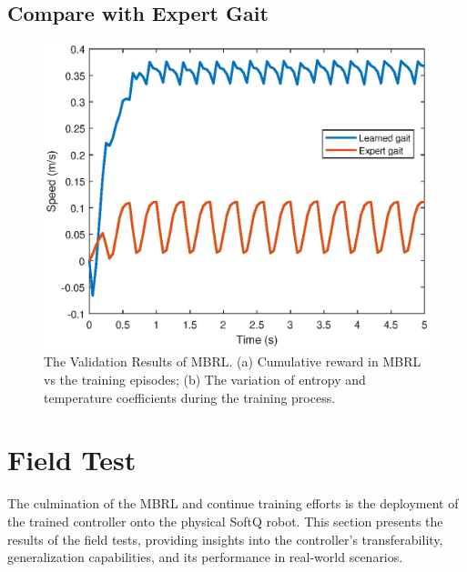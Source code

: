 

\subsection{Compare with Expert Gait}
\begin{figure}[htb]
    \centering
    \includegraphics[width=\linewidth]{img/chap5/vsexpert.eps}
    \caption{The Validation Results of MBRL. (a) Cumulative reward in MBRL vs the training episodes; (b) The variation of entropy and temperature coefficients during the training process.}
    \label{fig:vsExp}
\end{figure}


\section{Field Test}
The culmination of the MBRL and continue training efforts is the deployment of the trained controller onto the physical SoftQ robot. This section presents the results of the field tests, providing insights into the controller's transferability, generalization capabilities, and its performance in real-world scenarios.

